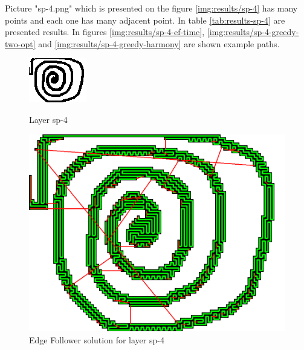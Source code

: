 \documentclass[titlepage]{article}
\newcommand{\multifigcaption}{\captionsetup{justification=justified}}
\begin{document}
Picture "sp-4.png" which is presented on the figure \ref{img:results/sp-4} has many points and each one has many adjacent point. In table \ref{tab:results-sp-4} are presented results. In figures \ref{img:results/sp-4-ef-time}, \ref{img:results/sp-4-greedy-two-opt} and \ref{img:results/sp-4-greedy-harmony} are shown example paths.

\begin{figure}[H]
	\begin{center}
		\begin{minipage}{.45\linewidth}
			\includegraphics[width=\textwidth]{img/results/sp-4.png}
			\multifigcaption
			\caption{Layer sp-4 \newline}
			\label{img:results/sp-4}
		\end{minipage}
		\hspace{.05\linewidth}
		\begin{minipage}{.45\linewidth}
			\includegraphics[width=\textwidth]{img/results/sp-4-ef-energy.png}
			\multifigcaption
			\caption{Edge Follower solution for layer sp-4}
			\label{img:results/sp-4-ef-energy}
		\end{minipage}
	\end{center}
\end{figure}
\end{document}

